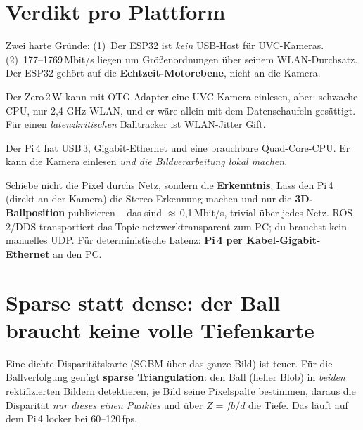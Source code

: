 \section{Verdikt pro Plattform}
\begin{description}[style=nextline,leftmargin=1.4em]
\item[ESP32 -- nein.] Zwei harte Gründe: (1)~Der ESP32 ist \emph{kein}
  USB-Host für UVC-Kameras. (2)~177--1769\,Mbit/s liegen um Größenordnungen
  über seinem WLAN-Durchsatz. Der ESP32 gehört auf die
  \textbf{Echtzeit-Motorebene}, nicht an die Kamera.
\item[Pi Zero -- technisch möglich, aber schlechte Idee.] Der Zero\,2\,W kann
  mit OTG-Adapter eine UVC-Kamera einlesen, aber: schwache CPU, nur
  2{,}4-GHz-WLAN, und er wäre allein mit dem Datenschaufeln gesättigt. Für
  einen \emph{latenzkritischen} Balltracker ist WLAN-Jitter Gift.
\item[Pi\,4 -- ja, und das ist der richtige Ansatz.] Der Pi\,4 hat USB\,3,
  Gigabit-Ethernet und eine brauchbare Quad-Core-CPU. Er kann die Kamera
  einlesen \emph{und die Bildverarbeitung lokal machen}.
\end{description}

\begin{infobox}[title={Das richtige Muster: am Rand rechnen, nur das Ergebnis senden}]
Schiebe nicht die Pixel durchs Netz, sondern die \textbf{Erkenntnis}. Lass den
Pi\,4 (direkt an der Kamera) die Stereo-Erkennung machen und nur die
\textbf{3D-Ballposition} publizieren -- das sind $\approx$\,0{,}1\,Mbit/s,
trivial über jedes Netz. ROS\,2/DDS transportiert das Topic
netzwerktransparent zum PC; du brauchst kein manuelles UDP. Für deterministische
Latenz: \textbf{Pi\,4 per Kabel-Gigabit-Ethernet} an den PC.
\end{infobox}

\section{Sparse statt dense: der Ball braucht keine volle Tiefenkarte}
Eine dichte Disparitätskarte (SGBM über das ganze Bild) ist teuer. Für die
Ballverfolgung genügt \textbf{sparse Triangulation}: den Ball (heller Blob) in
\emph{beiden} rektifizierten Bildern detektieren, je Bild seine Pixelspalte
bestimmen, daraus die Disparität \emph{nur dieses einen Punktes} und über
$Z=fb/d$ die Tiefe. Das läuft auf dem Pi\,4 locker bei 60--120\,fps.

